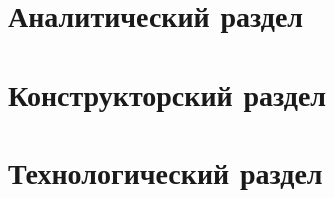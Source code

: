 \fontsize{14pt}{14pt}\selectfont


\newpage
\section{Аналитический раздел}

\newpage
\section{Конструкторский раздел}

\newpage
\section{Технологический раздел}

\newpage
{}

\newpage
{}

\newpage
{}
